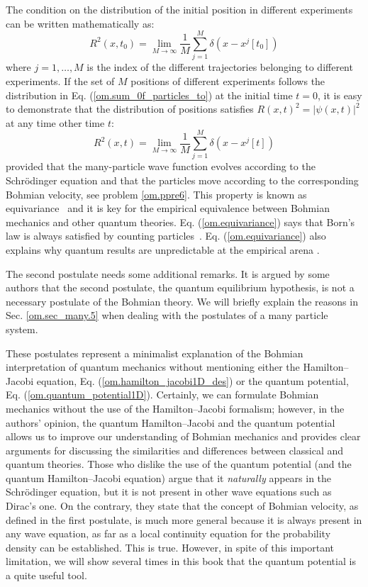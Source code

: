 \documentclass[nofootinbib, secnumarabic, amsmath, nobibnotes,11pt,aps,pra, floatfix]{revtex4-1}
\newcommand{\sref}[1]{Sec. \ref{#1}}
\newcommand{\eref}[1]{Eq. (\ref{#1})}
\begin{document}
The condition on the distribution of the initial position in different experiments can be written mathematically as:
\begin{equation}
\label{om.sum_0f_particles_to}
R^2(x,t_0) = \lim_{M\rightarrow\infty} \frac {1} {M} \sum_{j = 1}^{M} \delta(x-x^j[t_0])
\end{equation}
where $j = 1,\ldots,M$ is the index of the different trajectories belonging to different experiments. If the set of $M$ positions of different experiments follows the distribution in \eref{om.sum_0f_particles_to} at the initial time $t=0$, it is easy to demonstrate that the distribution of positions satisfies $R(x,t)^2 = |\psi(x,t)|^2$ at any time other time $t$:
\begin{equation}
\label{om.equivariance}
R^2(x,t) = \lim_{M\rightarrow\infty} \frac {1} {M} \sum_{j = 1}^{M} \delta(x-x^j[t])
\end{equation}
provided that the many-particle wave function evolves according to the Schr\"odinger equation and that the particles move according to the corresponding Bohmian velocity, see problem \ref{om.ppre6}. This property is known as equivariance~\cite{om.extra9,om.llibreph} and it is key for the empirical equivalence between Bohmian mechanics and other quantum theories.
\eref{om.equivariance} says that Born's law is always satisfied by counting particles~\cite{om.Holand1993,om.Durrllibre,om.reviewabc,om.llibreph}. 
\eref{om.equivariance} also explains 
why quantum results are unpredictable at the empirical arena \cite{om.randomness}. 

The second postulate needs some additional remarks. It is argued by some authors that the second postulate, the quantum
equilibrium hypothesis, is not a necessary postulate of the Bohmian theory.  We will briefly explain the reasons in \sref{om.sec_many.5} when dealing with the postulates of a many particle system.

These postulates represent a minimalist explanation of the Bohmian
interpretation of quantum mechanics without mentioning either the Hamilton--Jacobi
equation, \eref{om.hamilton_jacobi1D_des} or the quantum potential,
\eref{om.quantum_potential1D}. Certainly, we can formulate Bohmian
mechanics without the use of the Hamilton--Jacobi formalism;
however, in the authors' opinion, the quantum Hamilton--Jacobi and
the quantum potential allows us to improve our understanding of
Bohmian mechanics and provides clear arguments for discussing the
similarities and differences between classical and quantum theories. Those who dislike the use of the quantum potential (and the quantum Hamilton--Jacobi equation) argue that it \emph{naturally} appears in the Schr\"odinger equation, but it is not present in other wave equations such as Dirac's one. On the contrary, they state that the concept of Bohmian velocity, as defined in the first postulate, is much more general because it is always present in any wave equation, as far as a local continuity equation for the probability density can be established. This is true. However, in spite of this important limitation, we will show several times in this book that the quantum potential is a quite useful tool. 
\end{document}
